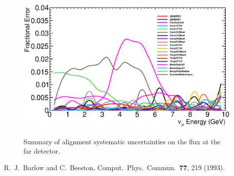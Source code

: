 \begin{figure}[ht]
  \begin{center}
    {\includegraphics[width=6.0in]{figures/error_summary_far.eps}}
  \end{center}
\caption{ Summary of alignment systematic uncertainties on the flux at the far detector.}
\end{figure}



\begin{thebibliography}{1}

  R.~J.~Barlow and C.~Beeston,
  Comput.\ Phys.\ Commun.\  {\bf 77}, 219 (1993).
  
\end{thebibliography}




























